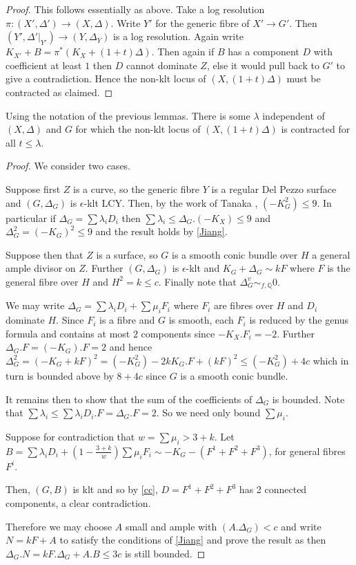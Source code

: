 \begin{proof}
	This follows essentially as above.
	Take a log resolution $\pi\colon (X',\Delta') \to (X,\Delta)$. Write $Y'$ for the generic fibre of $X' \to G'$. Then $(Y',\Delta'|_{Y'}) \to (Y,\Delta_{Y})$ is a log resolution. Again write $K_{X'}+B=\pi^{*}(K_{X}+(1+t)\Delta)$. Then again if $B$ has a component $D$ with coefficient at least $1$ then $D$ cannot dominate $Z$, else it would pull back to $G'$ to give a contradiction. Hence the non-klt locus of $(X,(1+t)\Delta)$ must be contracted as claimed. 
\end{proof}

\begin{lemma}
	Using the notation of the previous lemmas. There is some $\lambda$ independent of $(X,\Delta)$ and $G$ for which the non-klt locus of $(X,(1+t)\Delta)$ is contracted for all $t \leq \lambda$.
\end{lemma}
\begin{proof}
	We consider two cases. 
	
	Suppose first $Z$ is a curve, so the generic fibre $Y$ is a regular Del Pezzo surface and $(G,\Delta_{G})$ is $\epsilon$-klt LCY. Then, by the work of Tanaka \cite[Corollary 4.8]{tanaka2019boundedness}, $(-K_{G}^{2}) \leq 9$. In particular if $\Delta_{G}=\sum \lambda_{i}D_{i}$ then $\sum \lambda_{i} \leq \Delta_{G}.(-K_{X}) \leq 9$ and $\Delta_{G}^{2} =(-K_{G})^{2} \leq 9$ and the result holds by \autoref{Jiang}. 

	Suppose then that $Z$ is a surface, so $G$ is a smooth conic bundle over $H$ a general ample divisor on $Z$. Further $(G,\Delta_{G})$ is $\epsilon$-klt and $K_{G}+\Delta_{G}\sim kF$ where $F$ is the general fibre over $H$ and $H^{2}=k \leq c$. Finally note that $\Delta_{G}^{v} \sim_{f,\mathbb{Q}} 0$.

	We may write $\Delta_{G}= \sum \lambda_{i}D_{i}+ \sum \mu_{i}F_{i}$ where $F_{i}$ are fibres over $H$ and $D_{i}$ dominate $H$. Since $F_{i}$ is a fibre and $G$ is smooth, each $F_{i}$ is reduced by the genus formula and contains at most $2$ components since $-K_{X}.F_{i}=-2$. Further $\Delta_{G}.F=(-K_{G}).F=2$ and hence $\Delta_{G}^{2}=(-K_{G}+kF)^{2}=(-K_{G}^{2})-2kK_{G}.F +(kF)^{2} \leq (-K_{G}^{2})+4c$ which in turn is bounded above by $8+4c$ since $G$ is a smooth conic bundle\cite[Proposition III.21]{beauville1996complex}. 
	
	It remains then to show that the sum of the coefficients of $\Delta_{G}$ is bounded. Note that $\sum \lambda_{i} \leq \sum \lambda_{i}D_{i}.F =\Delta_{G}.F =2$. So we need only bound $\sum \mu_{i}$.
	
	Suppose for contradiction that $w=\sum \mu_{i} >3 +k$. Let $B=\sum \lambda_{i}D_{i} +(1-\frac{3+k}{w})\sum \mu_{i}F_{i}  \sim -K_{G}-(F^{1}+F^{2}+F^{3})$, for general fibres $F^{i}$.
	
	Then, $(G,B)$ is klt and so by \autoref{cc}, $D=F^{1}+F^{2}+F^{3}$ has 2 connected components, a clear contradiction.
	
	Therefore we may choose $A$ small and ample with $(A.\Delta_{G})<c$ and write $N=kF+A$ to satisfy the conditions of \autoref{Jiang} and prove the result as then $\Delta_{G}.N=kF.\Delta_{G}+A.B\leq 3c$ is still bounded.
\end{proof}
